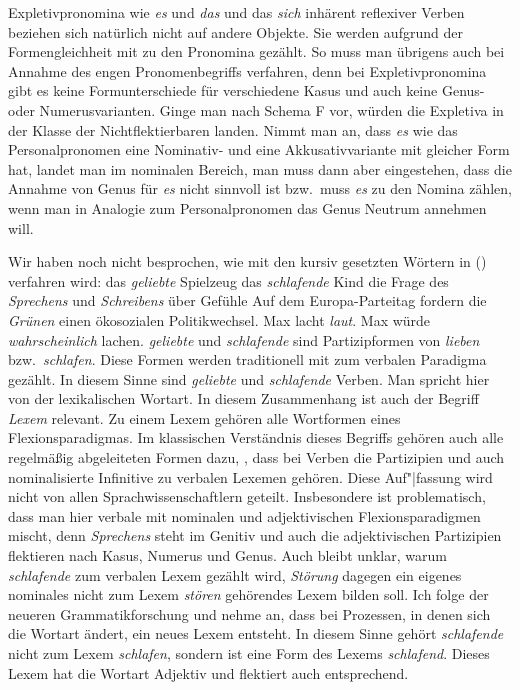 \documentclass[ number=45
			   ,series=eotms
			   ,printondemand
			  ]{langsci}
\begin{document}
{Expletivpronomina wie \emph{es} und \emph{das} und das \emph{sich} inhärent
reflexiver Verben beziehen sich
natürlich nicht auf andere Objekte. Sie werden aufgrund der Formengleichheit mit zu den Pronomina
gezählt. So muss man übrigens auch bei Annahme des engen Pronomenbegriffs verfahren, denn bei Expletivpronomina
gibt es keine Formunterschiede für verschiedene Kasus und auch keine Genus- oder
Numerusvarianten. Ginge man nach Schema F vor, würden die Expletiva in der Klasse der
Nichtflektierbaren landen. Nimmt man an, dass \emph{es} wie das Personalpronomen eine Nominativ- und
eine Akkusativvariante mit gleicher Form hat, landet man im nominalen Bereich, man muss dann aber
eingestehen, dass die Annahme von Genus für \emph{es} nicht sinnvoll ist bzw.\ muss \emph{es} zu den
Nomina zählen, wenn man in Analogie zum Personalpronomen das Genus Neutrum annehmen will.%

Wir haben noch nicht besprochen, wie mit den kursiv gesetzten Wörtern in () verfahren wird:
\eal
\ex das \emph{geliebte} Spielzeug
\ex das \emph{schlafende} Kind
\ex die Frage des \emph{Sprechens} und \emph{Schreibens} über Gefühle
\ex Auf dem Europa-Parteitag fordern die \emph{Grünen} einen ökosozialen Politikwechsel.
\ex\label{Wortart-adverbiales-Adjektiv} Max lacht \emph{laut}.
\ex\label{Wortart-Satzadverb-Adjektiv} Max würde \emph{wahrscheinlich} lachen.
\zl
\emph{geliebte} und \emph{schlafende} sind Partizipformen von \emph{lieben} bzw.\
\emph{schlafen}. Diese Formen werden traditionell mit zum verbalen Paradigma gezählt. In diesem
Sinne sind \emph{geliebte} und \emph{schlafende} Verben. Man spricht hier von der lexikalischen
Wortart. In diesem Zusammenhang ist auch der Begriff \emph{Lexem}\is{Lexem} relevant. Zu einem Lexem gehören
alle Wortformen eines Flexionsparadigmas.\is{Flexion}\is{Paradigma} Im klassischen Verständnis
dieses Begriffs gehören auch 
alle regelmäßig abgeleiteten Formen dazu, \dash, dass bei Verben die Partizipien und auch
nominalisierte Infinitive zu verbalen Lexemen gehören. Diese Auf"|fassung wird nicht von allen
Sprachwissenschaftlern geteilt. Insbesondere ist problematisch, dass man hier verbale mit nominalen
und adjektivischen Flexionsparadigmen mischt, denn \emph{Sprechens} steht im Genitiv und auch die
adjektivischen Partizipien flektieren nach Kasus, Numerus und Genus. Auch bleibt unklar, warum
\emph{schlafende} zum verbalen Lexem gezählt wird, \emph{Störung} dagegen ein eigenes nominales
nicht zum Lexem \emph{stören} gehörendes Lexem bilden soll. Ich folge der neueren Grammatikforschung
und nehme an, dass bei Prozessen, in denen sich die Wortart ändert, ein neues Lexem
entsteht. In diesem Sinne gehört \emph{schlafende} nicht zum Lexem \emph{schlafen}, sondern ist eine
Form des Lexems \emph{schlafend}. Dieses Lexem hat die Wortart Adjektiv und flektiert auch entsprechend. 

}
\end{document}
